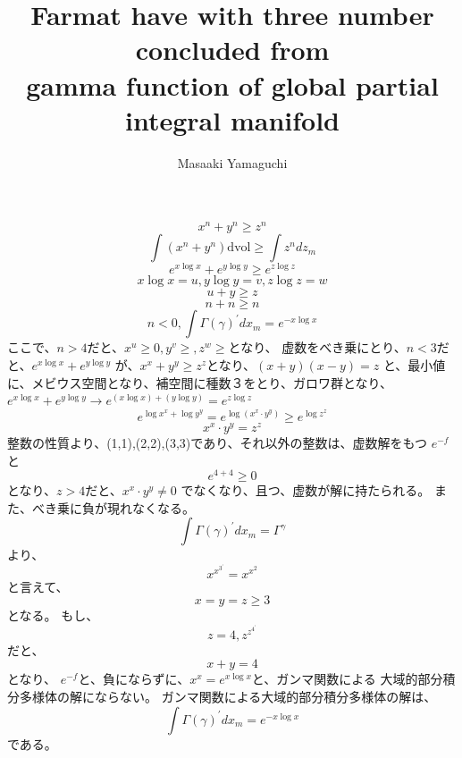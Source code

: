 \documentclass{jsarticle}
\begin{document}
\title{Farmat have with three number concluded from \\
gamma function of global partial integral manifold}
\author{Masaaki Yamaguchi}
\date{}
\maketitle

  $$ x^n + y^n \ge z^n $$
  $$ \int (x^n + y^n)\mathrm{dvol} \ge \int z^n dz_m $$
  $$ e^{x \log x} + e^{y \log y} \ge e^{z \log z} $$
  $$ x \log x = u, y \log y = v, z \log z=w $$
  $$ u + y \ge z $$
  $$ n + n \ge n $$
  $$ n < 0, \int \Gamma(\gamma)^{'}dx_m = e^{- x \log x} $$
  ここで、$ n > 4 $だと、$ x^{u} \ge 0, y^{v} \ge, z^{w} \ge $となり、
  虚数をべき乗にとり、$ n < 3 $だと、$ e^{x \log x} + e^{y \log y} $
  が、$ x^x + y^y \ge z^z $となり、$ (x + y)(x - y) = z $
  と、最小値に、メビウス空間となり、補空間に種数３をとり、ガロワ群となり、
  $ e^{x \log x} + e^{y \log y} \to e^{(x\log x)+(y \log y)} = e^{z \log z} $
  $$ e^{\log x^x + \log y^y} = e^{\log (x^x\cdot y^y)} \ge e^{\log z^z} $$ 
  $$ x^x \cdot y^y = z^z $$
  整数の性質より、(1,1),(2,2),(3,3)であり、それ以外の整数は、虚数解をもつ
  $ e^{-f} $と　
  $$ e^{4+4}\ge 0 $$
  となり、$ z > 4 $だと、$x^x \cdot y^y \neq 0 $
  でなくなり、且つ、虚数が解に持たられる。
  また、べき乗に負が現れなくなる。
  $$ \int \Gamma(\gamma)^{'}dx_m = \Gamma^{\gamma} $$
  より、
  $$ x^{x^{{3}^{'}}} = x^{x^2} $$
  と言えて、
  $$ x=y=z \ge 3 $$
  となる。
  もし、$$ z=4, z^{z^{{4}^{'}}} $$
  だと、
  $$ x + y = 4 $$
  となり、
  $ e^{-f} $と、負にならずに、$ x^x = e^{x \log x} $と、ガンマ関数による
  大域的部分積分多様体の解にならない。
  ガンマ関数による大域的部分積分多様体の解は、
  $$ \int \Gamma(\gamma)^{'}dx_m = e^{-x \log x} $$
  である。
\end{document}
